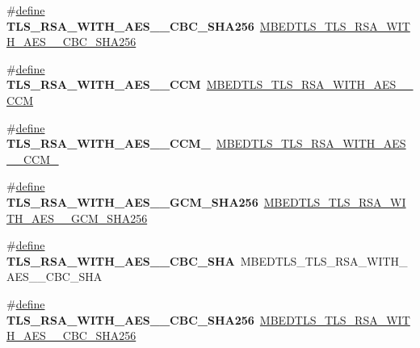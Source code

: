 \begin{DoxyCompactItemize}
\item 
\mbox{\label{compat-1_83_8h_a54355abc9101b3aa02477e02f76b46bd}} 
\#\hyperlink{structdefine}{define} {\bfseries T\+L\+S\+\_\+\+R\+S\+A\+\_\+\+W\+I\+T\+H\+\_\+\+A\+E\+S\+\_\+\_\+\+C\+B\+C\+\_\+\+S\+H\+A256}~\hyperlink{ssl__ciphersuites_8h_aaa6755f627cc0ad90c7602f0682c6e43}{M\+B\+E\+D\+T\+L\+S\+\_\+\+T\+L\+S\+\_\+\+R\+S\+A\+\_\+\+W\+I\+T\+H\+\_\+\+A\+E\+S\+\_\+\_\+\+C\+B\+C\+\_\+\+S\+H\+A256}
\item 
\mbox{\label{compat-1_83_8h_a0bc31dea187e19a84ea02749de509a63}} 
\#\hyperlink{structdefine}{define} {\bfseries T\+L\+S\+\_\+\+R\+S\+A\+\_\+\+W\+I\+T\+H\+\_\+\+A\+E\+S\+\_\+\_\+\+C\+CM}~\hyperlink{ssl__ciphersuites_8h_afb03032287daab618e63d7546c8b0b82}{M\+B\+E\+D\+T\+L\+S\+\_\+\+T\+L\+S\+\_\+\+R\+S\+A\+\_\+\+W\+I\+T\+H\+\_\+\+A\+E\+S\+\_\+\_\+\+C\+CM}
\item 
\mbox{\label{compat-1_83_8h_a565e29a90172e7eb87bc09db33485ea9}} 
\#\hyperlink{structdefine}{define} {\bfseries T\+L\+S\+\_\+\+R\+S\+A\+\_\+\+W\+I\+T\+H\+\_\+\+A\+E\+S\+\_\+\_\+\+C\+C\+M\+\_}~\hyperlink{ssl__ciphersuites_8h_aa68e1dc44eea702c14a84b25897ec1ad}{M\+B\+E\+D\+T\+L\+S\+\_\+\+T\+L\+S\+\_\+\+R\+S\+A\+\_\+\+W\+I\+T\+H\+\_\+\+A\+E\+S\+\_\+\_\+\+C\+C\+M\+\_}
\item 
\mbox{\label{compat-1_83_8h_a47cae4f1051ae290a4706ed1107c6606}} 
\#\hyperlink{structdefine}{define} {\bfseries T\+L\+S\+\_\+\+R\+S\+A\+\_\+\+W\+I\+T\+H\+\_\+\+A\+E\+S\+\_\+\_\+\+G\+C\+M\+\_\+\+S\+H\+A256}~\hyperlink{ssl__ciphersuites_8h_a1dd099744ffe76417ecc84a7979ef45f}{M\+B\+E\+D\+T\+L\+S\+\_\+\+T\+L\+S\+\_\+\+R\+S\+A\+\_\+\+W\+I\+T\+H\+\_\+\+A\+E\+S\+\_\+\_\+\+G\+C\+M\+\_\+\+S\+H\+A256}
\item 
\mbox{\label{compat-1_83_8h_a30ca15463d73a648cb95ea79e64606e3}} 
\#\hyperlink{structdefine}{define} {\bfseries T\+L\+S\+\_\+\+R\+S\+A\+\_\+\+W\+I\+T\+H\+\_\+\+A\+E\+S\+\_\+\_\+\+C\+B\+C\+\_\+\+S\+HA}~M\+B\+E\+D\+T\+L\+S\+\_\+\+T\+L\+S\+\_\+\+R\+S\+A\+\_\+\+W\+I\+T\+H\+\_\+\+A\+E\+S\+\_\+\_\+\+C\+B\+C\+\_\+\+S\+HA
\item 
\mbox{\label{compat-1_83_8h_a049cb14aa5985691cbcf3e9414141878}} 
\#\hyperlink{structdefine}{define} {\bfseries T\+L\+S\+\_\+\+R\+S\+A\+\_\+\+W\+I\+T\+H\+\_\+\+A\+E\+S\+\_\+\_\+\+C\+B\+C\+\_\+\+S\+H\+A256}~\hyperlink{ssl__ciphersuites_8h_a542c73000e3c2962855a4c62f85e9533}{M\+B\+E\+D\+T\+L\+S\+\_\+\+T\+L\+S\+\_\+\+R\+S\+A\+\_\+\+W\+I\+T\+H\+\_\+\+A\+E\+S\+\_\+\_\+\+C\+B\+C\+\_\+\+S\+H\+A256}

\end{DoxyCompactItemize}
